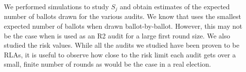 We performed simulations to study $S_j$ and obtain estimates of the expected number of ballots drawn for the various audits. We know that \BRAVO uses the smallest expected number of ballots when drawn ballot-by-ballot. However, this may not be the case when \BRAVO is used as an R2 audit for a large first round size. We also studied the risk values. While all the audits we studied have been proven to be RLAs, it is useful to observe how close to the risk limit each audit gets over a small, finite number of rounds as would be the case in a real election. 